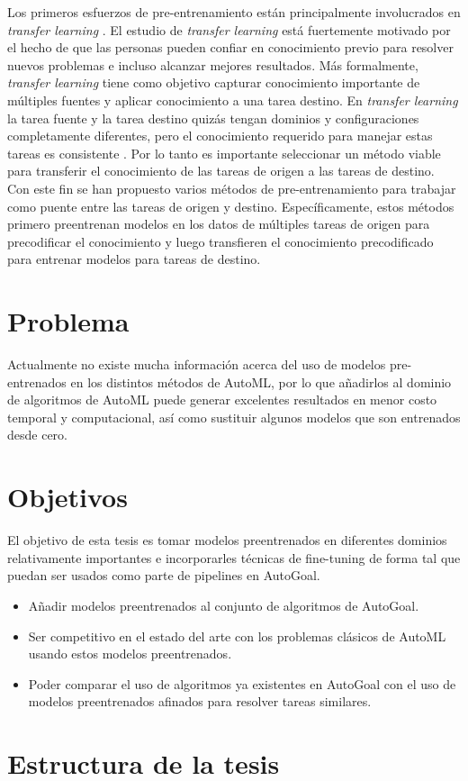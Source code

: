 Los primeros esfuerzos de pre-entrenamiento están principalmente involucrados en \textit{transfer learning} \parencite{9}. El estudio de \textit{transfer learning} está fuertemente motivado por el hecho de que las personas pueden confiar en conocimiento previo para resolver nuevos problemas e incluso alcanzar mejores resultados. Más formalmente, \textit{transfer learning} tiene como objetivo capturar conocimiento importante de múltiples fuentes y aplicar conocimiento a una tarea destino. En \textit{transfer learning} la tarea fuente y la tarea destino quizás tengan dominios y configuraciones completamente diferentes, pero el conocimiento requerido para manejar estas tareas es consistente \parencite{10}. Por lo tanto es importante seleccionar un método viable para transferir el conocimiento de las tareas de origen a las tareas de destino. Con este fin se han propuesto varios métodos de pre-entrenamiento para trabajar como puente entre las tareas de origen y destino. Específicamente, estos métodos primero preentrenan modelos en los datos de múltiples tareas de origen para precodificar el conocimiento y luego transfieren el conocimiento precodificado para entrenar modelos para tareas de destino.


\section*{Problema}

Actualmente no existe mucha información acerca del uso de modelos pre-entrenados en los distintos métodos de AutoML, por lo que añadirlos al dominio de algoritmos de AutoML puede generar excelentes resultados en menor costo temporal y computacional, así como sustituir algunos modelos que son entrenados desde cero.

\section*{Objetivos}
El objetivo de esta tesis es tomar modelos preentrenados en diferentes dominios relativamente importantes e incorporarles técnicas de fine-tuning de forma tal que puedan ser usados como parte de pipelines en AutoGoal.\\

\begin{itemize}

\item Añadir modelos preentrenados al conjunto de algoritmos de AutoGoal.
\item Ser competitivo en el estado del arte con los problemas clásicos de AutoML usando estos modelos preentrenados.
\item Poder comparar el uso de algoritmos ya existentes en AutoGoal con el uso de modelos preentrenados afinados para resolver tareas similares.

\end{itemize}

\section*{Estructura de la tesis}

